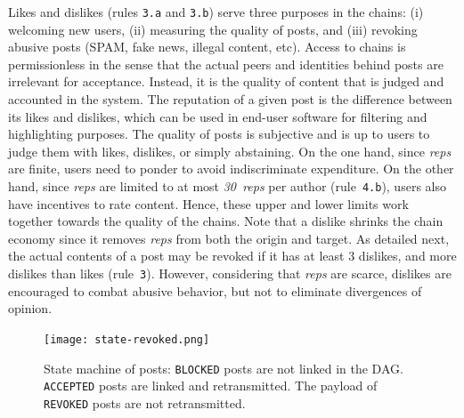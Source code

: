 \documentclass[10pt,journal,compsoc]{IEEEtran}
\newcommand{\reps}     {\emph{reps}\xspace}
\newcommand{\nreps}[1] {\emph{#1~reps\xspace}}
\newcommand{\code}[1]  {\texttt{\footnotesize{#1}}}
\begin{document}
Likes and dislikes (rules \code{3.a} and \code{3.b}) serve three purposes
in the chains:
    (i) welcoming new users,
    (ii) measuring the quality of posts, and
    (iii) revoking abusive posts (SPAM, fake news, illegal content, etc).
%
Access to chains is permissionless in the sense that the actual peers and
identities behind posts are irrelevant for acceptance.
Instead, it is the quality of content that is judged and accounted in the
system.
%
The reputation of a given post is the difference between its likes and
dislikes, which can be used in end-user software for filtering and highlighting
purposes.
%
The quality of posts is subjective and is up to users to judge them with likes,
dislikes, or simply abstaining.
%
On the one hand, since \reps are finite, users need to ponder to avoid
indiscriminate expenditure.
On the other hand, since \reps are limited to at most \nreps{30} per author
(rule~\code{4.b}), users also have incentives to rate content.
Hence, these upper and lower limits work together towards the quality of the
chains.
%
Note that a dislike shrinks the chain economy since it removes \reps from both
the origin and target.
As detailed next, the actual contents of a post may be revoked if it has at
least 3 dislikes, and more dislikes than likes (rule~\code{3}).
However, considering that \reps are scarce, dislikes are encouraged to combat
abusive behavior, but not to eliminate divergences of opinion.

\begin{figure}
\centering
\texttt{[image: state-revoked.png]}
\caption{
    State machine of posts:
    \code{BLOCKED} posts are not linked in the DAG.
    \code{ACCEPTED} posts are linked and retransmitted.
    The payload of \code{REVOKED} posts are not retransmitted.
}
\label{fig.state}
\end{figure}
\end{document}
